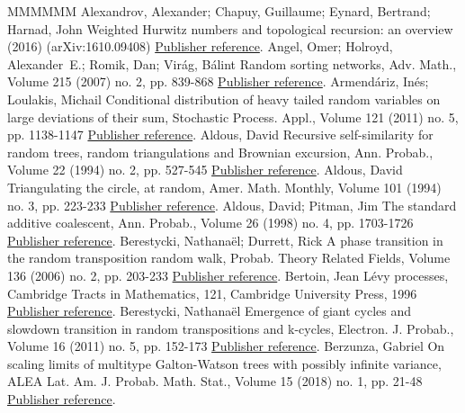 \begin{thebibliography}{MMMMMM}
 Alexandrov, Alexander; Chapuy, Guillaume; Eynard, Bertrand; Harnad, John Weighted Hurwitz numbers and topological recursion: an overview (2016) (arXiv:1610.09408) \href{https://ahl.centre-mersenne.org/item/AHL_2018__1__149_0/#ACEH16}{Publisher reference}.
 Angel, Omer; Holroyd, Alexander E.; Romik, Dan; Virág, Bálint Random sorting networks, Adv. Math., Volume 215 (2007) no. 2, pp. 839-868 \href{https://ahl.centre-mersenne.org/item/AHL_2018__1__149_0/#AHRV07}{Publisher reference}.
 Armendáriz, Inés; Loulakis, Michail Conditional distribution of heavy tailed random variables on large deviations of their sum, Stochastic Process. Appl., Volume 121 (2011) no. 5, pp. 1138-1147 \href{https://ahl.centre-mersenne.org/item/AHL_2018__1__149_0/#AL11}{Publisher reference}.
 Aldous, David Recursive self-similarity for random trees, random triangulations and Brownian excursion, Ann. Probab., Volume 22 (1994) no. 2, pp. 527-545 \href{https://ahl.centre-mersenne.org/item/AHL_2018__1__149_0/#Ald94a}{Publisher reference}.
 Aldous, David Triangulating the circle, at random, Amer. Math. Monthly, Volume 101 (1994) no. 3, pp. 223-233 \href{https://ahl.centre-mersenne.org/item/AHL_2018__1__149_0/#Ald94b}{Publisher reference}.
 Aldous, David; Pitman, Jim The standard additive coalescent, Ann. Probab., Volume 26 (1998) no. 4, pp. 1703-1726 \href{https://ahl.centre-mersenne.org/item/AHL_2018__1__149_0/#AP98}{Publisher reference}.
 Berestycki, Nathanaël; Durrett, Rick A phase transition in the random transposition random walk, Probab. Theory Related Fields, Volume 136 (2006) no. 2, pp. 203-233 \href{https://ahl.centre-mersenne.org/item/AHL_2018__1__149_0/#BD06}{Publisher reference}.
 Bertoin, Jean Lévy processes, Cambridge Tracts in Mathematics, 121, Cambridge University Press, 1996 \href{https://ahl.centre-mersenne.org/item/AHL_2018__1__149_0/#Ber96}{Publisher reference}.
 Berestycki, Nathanaël Emergence of giant cycles and slowdown transition in random transpositions and k-cycles, Electron. J. Probab., Volume 16 (2011) no. 5, pp. 152-173 \href{https://ahl.centre-mersenne.org/item/AHL_2018__1__149_0/#Ber11}{Publisher reference}.
 Berzunza, Gabriel On scaling limits of multitype Galton-Watson trees with possibly infinite variance, ALEA Lat. Am. J. Probab. Math. Stat., Volume 15 (2018) no. 1, pp. 21-48 \href{https://ahl.centre-mersenne.org/item/AHL_2018__1__149_0/#Ber16}{Publisher reference}.

\end{thebibliography}
